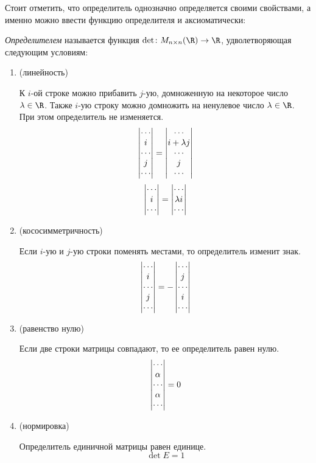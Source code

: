 Стоит отметить, что определитель однозначно определяется своими свойствами, а именно можно ввести функцию определителя и аксиоматически:

\emph{Определителем} называется функция $\det\colon M_{n\times n}(\R)\to\R$, удволетворяющая следующим условиям:

\begin{enumerate}
	\item(линейность)\par
		К $i$-ой строке можно прибавить $j$-ую, домноженную на некоторое число
		$\lambda\in\R$. Также $i$-ую строку можно домножить на ненулевое число
		$\lambda\in\R$. При этом определитель не изменяется.
		$$
			\begin{vmatrix}\cdots\\ i\\\cdots\\ j\\\cdots\end{vmatrix}=
			\begin{vmatrix}\cdots\\ i+\lambda j\\\cdots\\ j\\\cdots\end{vmatrix}
		$$ $$
			\begin{vmatrix}\cdots\\ i\\\cdots\end{vmatrix}=
			\begin{vmatrix}\cdots\\\lambda i\\\cdots\end{vmatrix}
		$$
	\item(кососимметричность)\par
		Если $i$-ую и $j$-ую строки поменять местами, то определитель изменит знак.
		$$
			\begin{vmatrix}\cdots\\ i\\\cdots\\ j\\\cdots\end{vmatrix}=-
			\begin{vmatrix}\cdots\\ j\\\cdots\\ i\\\cdots\end{vmatrix}
		$$
	\item(равенство нулю)\par
		Если две строки матрицы совпадают, то ее определитель равен нулю.
		$$
			\begin{vmatrix}\cdots\\\alpha\\\cdots\\\alpha\\\cdots\end{vmatrix}=0
		$$
	\item(нормировка)\par
		Определитель единичной матрицы равен единице.
		$$ \det E=1 $$
\end{enumerate}

